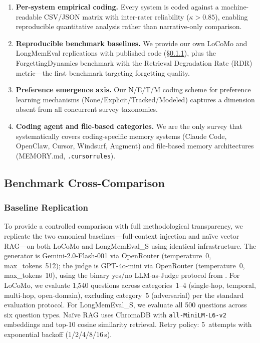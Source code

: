 \begin{enumerate}[leftmargin=*, nosep]
  \item \textbf{Per-system empirical coding.}  Every system is coded
    against a machine-readable CSV/JSON matrix with inter-rater
    reliability ($\kappa > 0.85$), enabling reproducible quantitative
    analysis rather than narrative-only comparison.
  \item \textbf{Reproducible benchmark baselines.}  We provide our own
    LoCoMo and LongMemEval replications with published code
    (\S\ref{sec:baseline-replication}), plus the ForgettingDynamics
    benchmark with the Retrieval Degradation Rate (RDR) metric---the
    first benchmark targeting forgetting quality.
  \item \textbf{Preference emergence axis.}  Our N/E/T/M coding scheme
    for preference learning mechanisms (None/Explicit/Tracked/Modeled)
    captures a dimension absent from all concurrent survey taxonomies.
  \item \textbf{Coding agent and file-based categories.}  We are the
    only survey that systematically covers coding-specific memory systems
    (Claude Code, OpenClaw, Cursor, Windsurf, Augment) and file-based
    memory architectures (MEMORY.md, \texttt{.cursorrules}).
\end{enumerate}

\subsection{Benchmark Cross-Comparison}
\label{sec:benchmark-cross-comparison}



\subsubsection{Baseline Replication}
\label{sec:baseline-replication}

To provide a controlled comparison with full methodological transparency, we
replicate the two canonical baselines---full-context injection and na\"ive
vector RAG---on both LoCoMo and LongMemEval\_S using identical infrastructure.
The generator is Gemini-2.0-Flash-001 via OpenRouter (temperature~0,
max\_tokens~512); the judge is GPT-4o-mini via OpenRouter (temperature~0,
max\_tokens~10), using the binary yes/no LLM-as-Judge protocol from
\cite{maharana2024locomo}.  For LoCoMo, we evaluate 1{,}540 questions across
categories~1--4 (single-hop, temporal, multi-hop, open-domain), excluding
category~5 (adversarial) per the standard evaluation protocol.  For
LongMemEval\_S, we evaluate all 500 questions across six question types.
Na\"ive RAG uses ChromaDB with \texttt{all-MiniLM-L6-v2} embeddings and
top-10 cosine similarity retrieval.  Retry policy: 5~attempts with
exponential backoff (1/2/4/8/16\,s).

